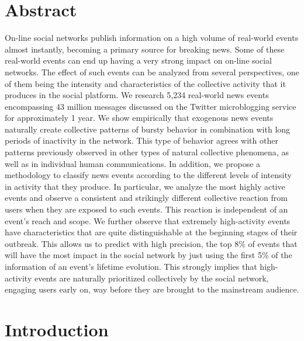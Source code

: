 \documentclass[10pt,letterpaper]{article}
\begin{document}
\section*{Abstract}

On-line social networks publish information on a high volume of
real-world events almost instantly, becoming a primary source for
breaking news.  Some of these real-world events can end up
having a very strong impact on on-line social networks.  The effect of such
events can be analyzed from several perspectives, one of them being
the intensity and characteristics of the collective activity that it
produces in the social platform.
We research 5,234 real-world news events encompassing 43 million
messages discussed on the Twitter microblogging service for
approximately 1 year.  We show empirically that exogenous news events
naturally create
collective patterns of bursty behavior in combination with long periods of
inactivity in the network. This type of behavior agrees with
other patterns previously observed in other types of natural collective phenomena, as
well as in individual human communications. In addition, we propose a methodology to
classify news events according to the different levels of intensity in
activity that they produce. In particular, we analyze the most
highly active events and 
observe a consistent and strikingly different collective reaction
from users when they are exposed to such events.  This reaction is
independent of an event's reach and scope.  We further observe that
extremely high-activity events have characteristics that are quite distinguishable
at the beginning stages of their outbreak.  This allows us to predict
with high precision, the top 8\% of events that will have the most
impact in the social network by just using the first 5\% of the information of an
event's lifetime evolution. This strongly implies that high-activity events
are naturally prioritized collectively by the social network, engaging users early
on, way before they are brought to the mainstream audience.

\linenumbers

\section*{Introduction}
\end{document}
